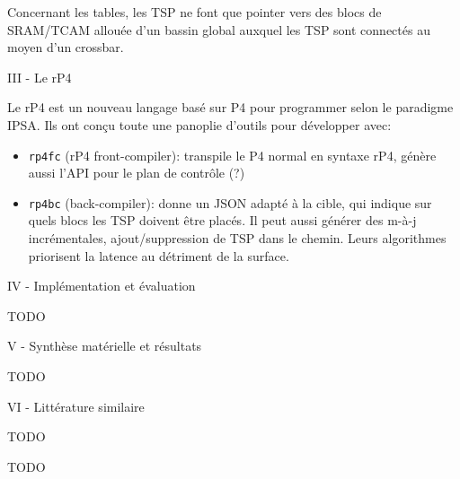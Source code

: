Concernant les tables, les TSP ne font que pointer vers des blocs de SRAM/TCAM allouée d'un bassin global auxquel les TSP sont connectés au moyen d'un crossbar.

III - Le rP4

Le rP4 est un nouveau langage basé sur P4 pour programmer selon le paradigme IPSA. Ils ont conçu toute une panoplie d'outils pour développer avec:
\begin{itemize}
	\item{\texttt{rp4fc} (rP4 front-compiler): transpile le P4 normal en syntaxe rP4, génère aussi l'API pour le plan de contrôle (?)}
	\item{\texttt{rp4bc} (back-compiler): donne un JSON adapté à la cible, qui indique sur quels blocs les TSP doivent être placés. Il peut aussi générer des m-à-j incrémentales, ajout/suppression de TSP dans le chemin. Leurs algorithmes priorisent la latence au détriment de la surface.}
\end{itemize}

IV - Implémentation et évaluation

TODO

V - Synthèse matérielle et résultats

TODO

VI - Littérature similaire

TODO

 TODO

\clearpage

